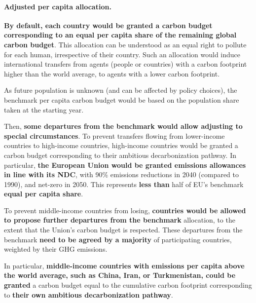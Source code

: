 \documentclass[12pt,english]{article}
\begin{document}
\paragraph{Adjusted per capita allocation.}
\textbf{By default, each country would be granted a carbon budget corresponding to an equal per capita share of the remaining global carbon budget}. This allocation can be understood as an equal right to pollute for each human, irrespective of their country. Such an allocation would induce international transfers from agents (people or countries) with a carbon footprint higher than the world average, to agents with a lower carbon footprint.

As future population is unknown (and can be affected by policy choices), the benchmark per capita carbon budget would be based on the population share taken at the starting year. %

Then, \textbf{some departures from the benchmark would allow adjusting to special circumstances}. To prevent transfers flowing from lower-income countries to high-income countries, high-income countries would be granted a carbon budget corresponding to their ambitious decarbonization pathway. %
In particular, \textbf{the European Union would be granted emissions allowances in line with its NDC}, with 90\% emissions reductions in 2040 (compared to 1990), and net-zero in 2050. This represents \textbf{less than} half of EU's benchmark \textbf{equal per capita share}.

To prevent middle-income countries from losing, %
\textbf{countries would be allowed to propose further departures from the benchmark} allocation, to the extent that the Union's carbon budget is respected. These departures from the benchmark \textbf{need to be agreed by a majority} of participating countries, weighted by their GHG emissions. %

In particular, \textbf{middle-income countries with emissions per capita above the world average, such as China, Iran, or Turkmenistan, could be granted} a carbon budget equal to the cumulative carbon footprint corresponding to \textbf{their own ambitious decarbonization pathway}.
\end{document}
